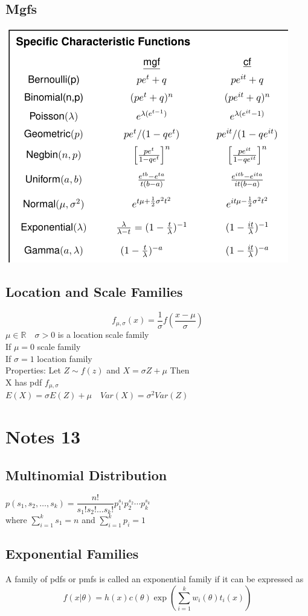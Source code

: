\documentclass[openany]{book}
\begin{document}
\begin{flushleft}
\section{Mgfs}
\includegraphics[scale=1]{mgfchar.png}
\section{Location and Scale Families}
\[f_{\mu,\sigma}(x)=\dfrac{1}{\sigma}f\left(\dfrac{x-\mu}{\sigma} \right)
\]
$\mu \in \mathbb{R} \quad \sigma>0$ is a location scale family\\
If $\mu=0$ scale family\\
If $\sigma=1$ location family\\
Properties: Let $Z\sim f(z)$ and $X=\sigma Z+\mu$ Then\\
X has pdf $f_{\mu,\sigma}$\\
$E(X)=\sigma E(Z)+\mu \quad Var(X)=\sigma^2 Var(Z)$

\chapter{Notes 13}
\section{Multinomial Distribution}
$p(s_1,s_2,\dots,s_k)=\dfrac{n!}{s_1!s_2!\dots s_k!}p_1^{s_1}p_2^{s_2}\cdots p_k^{s_k}$\\
where $\sum_{i=1}^{k}s_1=n$ and $\sum_{i=1}^{k}p_i=1$
\section{Exponential Families}
A family of pdfs or pmfs is called an exponential family if it can be expressed as
\[f(x|\theta)=h(x)c(\theta)\exp\left(\sum_{i=1}^{k}w_i(\theta)t_i(x)\right)
\]


\end{flushleft}
\end{document}
